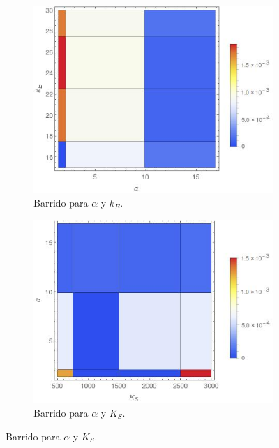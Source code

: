 \documentclass[12pt]{article}
\begin{document}
\begin{figure}[H]
  \begin{subfigure}[b]{0.5\textwidth}
  	\centering
  	\includegraphics[width=\textwidth]{alpha-kE.jpeg}
  	\caption{\label{fig:alpha-kE} Barrido para $\alpha$ y $k_E$.}
  \end{subfigure}
  \begin{subfigure}[b]{0.5\textwidth}
  	\centering
  	\includegraphics[width=\textwidth]{alpha-KS.jpeg}
  	\caption{\label{fig:alpha-kS} Barrido para $\alpha$ y $K_S$.}
  \end{subfigure}
    

\end{figure}
\end{document}
